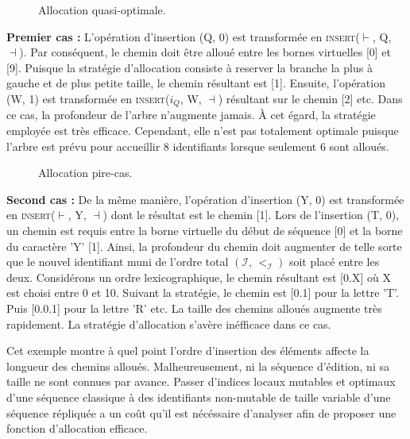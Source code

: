 \begin{wrapfigure}{r}{0.45\textwidth}
  \vspace{-15pt}
  \centering
  
  \caption{\label{repl:fig:allocpathexampleA}Allocation quasi-optimale.}
  \vspace{-15pt}
\end{wrapfigure}

\textbf{Premier cas :} L'opération d'insertion (Q, 0) est transformée en
\textsc{insert}($\vdash$, Q, $\dashv$). Par conséquent, le chemin doit être
alloué entre les bornes virtuelles [0] et [9]. Puisque la stratégie d'allocation
consiste à reserver la branche la plus à gauche et de plus petite taille, le
chemin résultant est [1]. Ensuite, l'opération (W, 1) est transformée en
\textsc{insert}($i_Q$, W, $\dashv$) résultant sur le chemin [2] etc.  Dans ce
cas, la profondeur de l'arbre n'augmente jamais. À cet égard, la stratégie
employée est très efficace. Cependant, elle n'est pas totalement optimale
puisque l'arbre est prévu pour accueillir 8 identifiants lorsque seulement 6
sont alloués.

\begin{wrapfigure}{r}{0.45\textwidth}
  \vspace{-10pt}
  \centering
  
  \caption{\label{repl:fig:allocpathexampleB}Allocation pire-cas.}
  \vspace{-10pt}
\end{wrapfigure}

\textbf{Second cas :} De la même manière, l'opération d'insertion (Y, 0) est
transformée en \textsc{insert}($\vdash$, Y, $\dashv$) dont le résultat est le
chemin [1]. Lors de l'insertion (T, 0), un chemin est requis entre la borne
virtuelle du début de séquence [0] et la borne du caractère 'Y' [1]. Ainsi, la
profondeur du chemin doit augmenter de telle sorte que le nouvel identifiant
muni de l'ordre total $(\mathcal{I},\,<_\mathcal{I})$ soit placé entre les
deux. Considérons un ordre lexicographique, le chemin résultant est [0.X] où X
est choisi entre 0 et 10. Suivant la stratégie, le chemin est [0.1] pour la
lettre 'T'. Puis [0.0.1] pour la lettre 'R' etc. La taille des chemins alloués
augmente très rapidement.  La stratégie d'allocation s'avère inéfficace dans ce
cas.

Cet exemple montre à quel point l'ordre d'insertion des éléments affecte la
longueur des chemins alloués. Malheureusement, ni la séquence d'édition, ni sa
taille ne sont connues par avance.  Passer d'indices locaux mutables et optimaux
d'une séquence classique à des identifiants non-mutable de taille variable d'une
séquence répliquée a un coût qu'il est nécéssaire d'analyser afin de proposer
une fonction d'allocation efficace.

